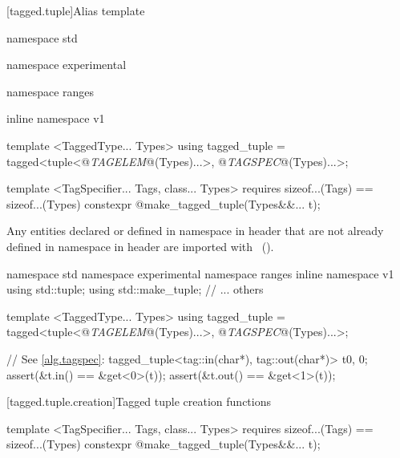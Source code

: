 [tagged.tuple]{Alias template }

\pnum
{}

\begin{codeblock}
namespace std { namespace experimental { namespace ranges { inline namespace v1 {
  template <TaggedType... Types>
  using tagged_tuple = tagged<tuple<@\textit{TAGELEM}@(Types)...>,
                              @\textit{TAGSPEC}@(Types)...>;

  template <TagSpecifier... Tags, class... Types>
    requires sizeof...(Tags) == sizeof...(Types)
      constexpr @\seebelow@ make_tagged_tuple(Types&&... t);
}}}}
\end{codeblock}

\pnum
Any entities declared or defined in namespace  in header 
that are not already defined in namespace  in header
 are imported with
~(). \enterexample
\begin{codeblock}
namespace std { namespace experimental { namespace ranges { inline namespace v1 {
  using std::tuple;
  using std::make_tuple;
  // ... others
}}}}
\end{codeblock}
\exitexample

\pnum
\begin{codeblock}
template <TaggedType... Types>
using tagged_tuple = tagged<tuple<@\textit{TAGELEM}@(Types)...>,
                            @\textit{TAGSPEC}@(Types)...>;
\end{codeblock}

\pnum \enterexample
\begin{codeblock}
// See \ref{alg.tagspec}:
tagged_tuple<tag::in(char*), tag::out(char*)> t{0, 0};
assert(&t.in() == &get<0>(t));
assert(&t.out() == &get<1>(t));
\end{codeblock}
\exitexample

[tagged.tuple.creation]{Tagged tuple creation functions}

%
%
\begin{itemdecl}
template <TagSpecifier... Tags, class... Types>
  requires sizeof...(Tags) == sizeof...(Types)
    constexpr @\seebelow@ make_tagged_tuple(Types&&... t);
\end{itemdecl}

